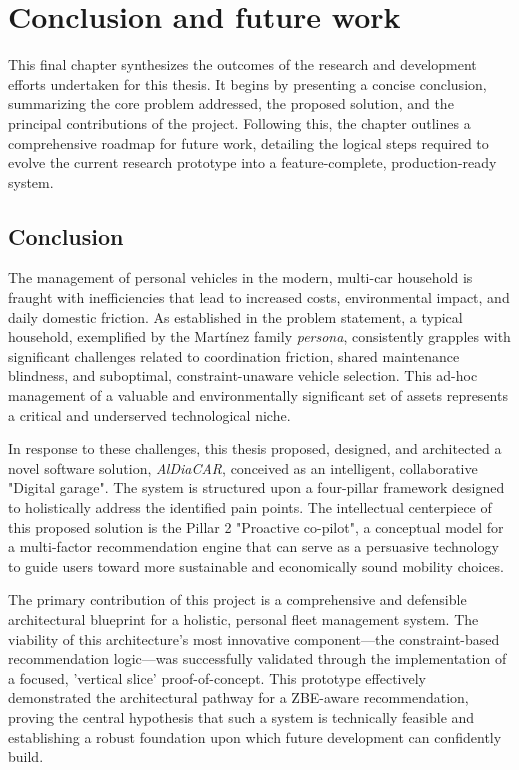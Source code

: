 \chapter{Conclusion and future work}

This final chapter synthesizes the outcomes of the research and development efforts undertaken for this thesis. It begins by presenting a concise conclusion, summarizing the core problem addressed, the proposed solution, and the principal contributions of the project. Following this, the chapter outlines a comprehensive roadmap for future work, detailing the logical steps required to evolve the current research prototype into a feature-complete, production-ready system.

\section{Conclusion}

The management of personal vehicles in the modern, multi-car household is fraught with inefficiencies that lead to increased costs, environmental impact, and daily domestic friction. As established in the problem statement, a typical household, exemplified by the Martínez family \textit{persona}, consistently grapples with significant challenges related to coordination friction, shared maintenance blindness, and suboptimal, constraint-unaware vehicle selection. This ad-hoc management of a valuable and environmentally significant set of assets represents a critical and underserved technological niche.

\textgap

In response to these challenges, this thesis proposed, designed, and architected a novel software solution, \textit{AlDiaCAR}, conceived as an intelligent, collaborative "Digital garage". The system is structured upon a four-pillar framework designed to holistically address the identified pain points. The intellectual centerpiece of this proposed solution is the Pillar 2 "Proactive co-pilot", a conceptual model for a multi-factor recommendation engine that can serve as a persuasive technology to guide users toward more sustainable and economically sound mobility choices.

\textgap

The primary contribution of this project is a comprehensive and defensible architectural blueprint for a holistic, personal fleet management system. The viability of this architecture's most innovative component—the constraint-based recommendation logic—was successfully validated through the implementation of a focused, 'vertical slice' proof-of-concept. This prototype effectively demonstrated the architectural pathway for a ZBE-aware recommendation, proving the central hypothesis that such a system is technically feasible and establishing a robust foundation upon which future development can confidently build.

